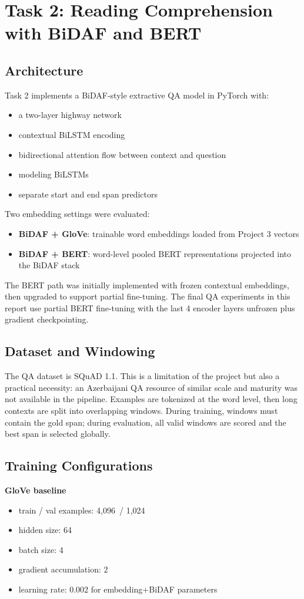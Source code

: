 \documentclass[11pt]{article}
\newcommand{\gloveTrain}{4{,}096}
\newcommand{\gloveVal}{1{,}024}
\begin{document}
\section{Task 2: Reading Comprehension with BiDAF and BERT}
\subsection{Architecture}
Task 2 implements a BiDAF-style extractive QA model in PyTorch with:
\begin{itemize}
    \item a two-layer highway network
    \item contextual BiLSTM encoding
    \item bidirectional attention flow between context and question
    \item modeling BiLSTMs
    \item separate start and end span predictors
\end{itemize}

Two embedding settings were evaluated:
\begin{itemize}
    \item \textbf{BiDAF + GloVe}: trainable word embeddings loaded from Project 3 vectors
    \item \textbf{BiDAF + BERT}: word-level pooled BERT representations projected into the BiDAF stack
\end{itemize}

The BERT path was initially implemented with frozen contextual embeddings, then upgraded to support partial fine-tuning. The final QA experiments in this report use partial BERT fine-tuning with the last 4 encoder layers unfrozen plus gradient checkpointing.

\subsection{Dataset and Windowing}
The QA dataset is SQuAD 1.1. This is a limitation of the project but also a practical necessity: an Azerbaijani QA resource of similar scale and maturity was not available in the pipeline. Examples are tokenized at the word level, then long contexts are split into overlapping windows. During training, windows must contain the gold span; during evaluation, all valid windows are scored and the best span is selected globally.

\subsection{Training Configurations}
\textbf{GloVe baseline}
\begin{itemize}
    \item train / val examples: \gloveTrain\ / \gloveVal
    \item hidden size: 64
    \item batch size: 4
    \item gradient accumulation: 2
    \item learning rate: 0.002 for embedding+BiDAF parameters
\end{itemize}
\end{document}
